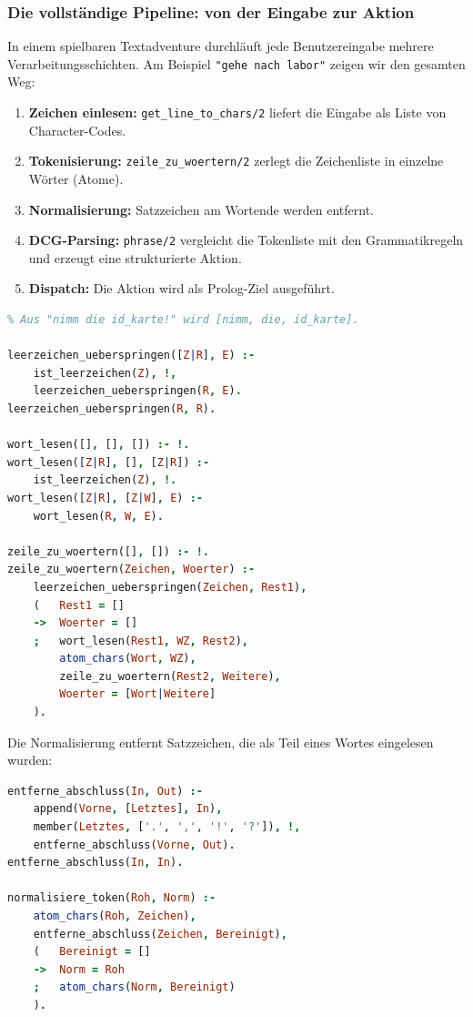 \documentclass[parskip=half,a4paper,11pt]{scrreprt}
\begin{document}
\subsubsection{Die vollständige Pipeline: von der Eingabe zur Aktion}

In einem spielbaren Textadventure durchläuft jede Benutzereingabe mehrere Verarbeitungsschichten. Am Beispiel \texttt{"gehe nach labor"} zeigen wir den gesamten Weg:

\begin{enumerate}
    \item \textbf{Zeichen einlesen:} \texttt{get\_line\_to\_chars/2} liefert die Eingabe als Liste von Character-Codes.
    \item \textbf{Tokenisierung:} \texttt{zeile\_zu\_woertern/2} zerlegt die Zeichenliste in einzelne Wörter (Atome).
    \item \textbf{Normalisierung:} Satzzeichen am Wortende werden entfernt.
    \item \textbf{DCG-Parsing:} \texttt{phrase/2} vergleicht die Tokenliste mit den Grammatikregeln und erzeugt eine strukturierte Aktion.
    \item \textbf{Dispatch:} Die Aktion wird als Prolog-Ziel ausgeführt.
\end{enumerate}

\begin{lstlisting}[language=Prolog, caption={Tokenisierung einer Eingabezeile}]
% Aus "gehe nach labor" wird die Liste [gehe, nach, labor].
% Aus "nimm die id_karte!" wird [nimm, die, id_karte].

leerzeichen_ueberspringen([Z|R], E) :-
    ist_leerzeichen(Z), !,
    leerzeichen_ueberspringen(R, E).
leerzeichen_ueberspringen(R, R).

wort_lesen([], [], []) :- !.
wort_lesen([Z|R], [], [Z|R]) :-
    ist_leerzeichen(Z), !.
wort_lesen([Z|R], [Z|W], E) :-
    wort_lesen(R, W, E).

zeile_zu_woertern([], []) :- !.
zeile_zu_woertern(Zeichen, Woerter) :-
    leerzeichen_ueberspringen(Zeichen, Rest1),
    (   Rest1 = []
    ->  Woerter = []
    ;   wort_lesen(Rest1, WZ, Rest2),
        atom_chars(Wort, WZ),
        zeile_zu_woertern(Rest2, Weitere),
        Woerter = [Wort|Weitere]
    ).
\end{lstlisting}

Die Normalisierung entfernt Satzzeichen, die als Teil eines Wortes eingelesen wurden:

\begin{lstlisting}[language=Prolog, caption={Normalisierung: Satzzeichen entfernen}]
entferne_abschluss(In, Out) :-
    append(Vorne, [Letztes], In),
    member(Letztes, ['.', ',', '!', '?']), !,
    entferne_abschluss(Vorne, Out).
entferne_abschluss(In, In).

normalisiere_token(Roh, Norm) :-
    atom_chars(Roh, Zeichen),
    entferne_abschluss(Zeichen, Bereinigt),
    (   Bereinigt = []
    ->  Norm = Roh
    ;   atom_chars(Norm, Bereinigt)
    ).
\end{lstlisting}
\end{document}
